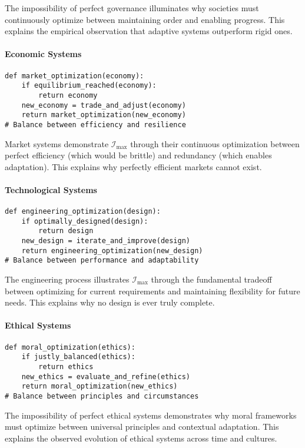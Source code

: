 \documentclass[12pt]{article}
\begin{document}
The impossibility of perfect governance illuminates why societies must continuously optimize between maintaining order and enabling progress. This explains the empirical observation that adaptive systems outperform rigid ones.

\paragraph{Economic Systems}
\begin{verbatim}
def market_optimization(economy):
    if equilibrium_reached(economy):
        return economy
    new_economy = trade_and_adjust(economy)
    return market_optimization(new_economy)
# Balance between efficiency and resilience
\end{verbatim}

Market systems demonstrate $\mathcal{I}_{\text{max}}$ through their continuous optimization between perfect efficiency (which would be brittle) and redundancy (which enables adaptation). This explains why perfectly efficient markets cannot exist.

\paragraph{Technological Systems}
\begin{verbatim}
def engineering_optimization(design):
    if optimally_designed(design):
        return design
    new_design = iterate_and_improve(design)
    return engineering_optimization(new_design)
# Balance between performance and adaptability
\end{verbatim}

The engineering process illustrates $\mathcal{I}_{\text{max}}$ through the fundamental tradeoff between optimizing for current requirements and maintaining flexibility for future needs. This explains why no design is ever truly complete.

\paragraph{Ethical Systems}
\begin{verbatim}
def moral_optimization(ethics):
    if justly_balanced(ethics):
        return ethics
    new_ethics = evaluate_and_refine(ethics)
    return moral_optimization(new_ethics)
# Balance between principles and circumstances
\end{verbatim}

The impossibility of perfect ethical systems demonstrates why moral frameworks must optimize between universal principles and contextual adaptation. This explains the observed evolution of ethical systems across time and cultures.
\end{document}
